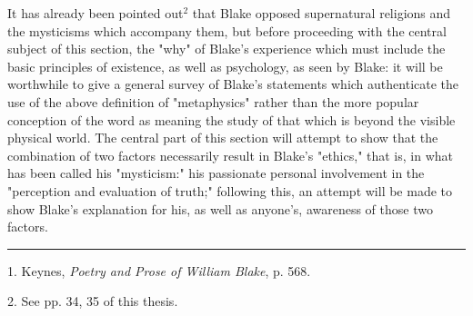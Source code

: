 \hspace*{5mm}It has already been pointed out$^{2}$ that Blake opposed supernatural religions and the mysticisms which accompany them,
but before proceeding with the central subject of this section, the "why" of Blake's experience which must include the
basic principles of existence, as well as psychology, as seen by Blake: it will be worthwhile to give
a general survey of Blake's statements which authenticate the use of the above definition of "metaphysics" rather
than the more popular conception of the word as meaning the study of that which is beyond the visible physical world.
The central part of this section will attempt to show that the combination of two factors necessarily result in
Blake's "ethics," that is, in what has been called his "mysticism:" his passionate personal
involvement in the "perception and evaluation of truth;" following this, an attempt will be made to
show Blake's explanation for his, as well as anyone's, awareness of those two factors.\par
\vspace*{\fill}
\noindent\rule{0.25\textwidth}{0.4pt}\par
1. Keynes, \textit{Poetry and Prose of William Blake}, p. 568.\par
2. See pp. 34, 35 of this thesis.\par

\newpage

